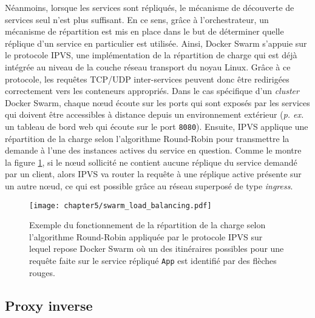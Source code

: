 Néanmoins, lorsque les services sont répliqués, le mécanisme de découverte de services seul n'est plus suffisant. En ce sens, grâce à l'orchestrateur,  un mécanisme de répartition est mis en place dans le but de déterminer quelle réplique d'un service en particulier est utilisée. Ainsi, Docker Swarm s'appuie sur le protocole \ac{IPVS}, une implémentation de la répartition de charge qui est déjà intégrée au niveau de la couche réseau transport du noyau Linux. Grâce à ce protocole, les requêtes \acs{TCP}/\acs{UDP} inter-services peuvent donc être redirigées correctement vers les conteneurs appropriés. Dans le cas spécifique d'un \textit{cluster} Docker Swarm, chaque n\oe{}ud écoute sur les ports qui sont exposés par les services qui doivent être accessibles à distance depuis un environnement extérieur (\textit{p. ex.} un tableau de bord web qui écoute sur le port \texttt{8080}). Ensuite, \acs{IPVS} applique une répartition de la charge selon l'algorithme Round-Robin \citep{Ghaffarinejad2014} pour transmettre la demande à l'une des instances actives du service en question. Comme le montre la figure \ref{fig:swarm_load_balancing}, si le n\oe{}ud sollicité ne contient aucune réplique du service demandé par un client, alors \acs{IPVS} va router la requête à une réplique active présente sur un autre n\oe{}ud, ce qui est possible grâce au réseau superposé de type \textit{ingress}.

\begin{figure}[H]
	\centering
	\texttt{[image: chapter5/swarm\_load\_balancing.pdf]}
        \caption{Exemple du fonctionnement de la répartition de la charge selon l'algorithme Round-Robin appliquée par le protocole \acs{IPVS} sur lequel repose Docker Swarm où un des itinéraires possibles pour une requête faite sur le service répliqué \texttt{App} est identifié par des flèches rouges.}
	\label{fig:swarm_load_balancing}
\end{figure}

\subsection{Proxy inverse}

